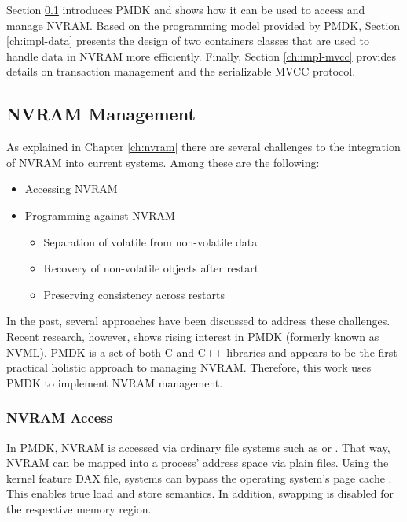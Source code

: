 Section \ref{ch:impl-nvram} introduces PMDK and shows how it can be used to
access and manage NVRAM. Based on the programming model provided by PMDK, Section
\ref{ch:impl-data} presents the design of two containers classes that are used
to handle data in NVRAM more efficiently. Finally, Section \ref{ch:impl-mvcc}
provides details on transaction management and the serializable MVCC protocol.

\subsection{NVRAM Management}
\label{ch:impl-nvram}

As explained in Chapter \ref{ch:nvram} there are several challenges to the
integration of NVRAM into current systems. Among these are the following:

\begin{itemize}
    \item Accessing NVRAM
    \item Programming against NVRAM
    \begin{itemize}
        \item Separation of volatile from non-volatile data
        \item Recovery of non-volatile objects after restart
        \item Preserving consistency across restarts
    \end{itemize}
\end{itemize}

In the past, several approaches have been discussed to address these challenges.
Recent research, however, shows rising interest in PMDK (formerly known as
NVML). PMDK is a set of both C and C++ libraries and appears to be the first
practical holistic approach to managing NVRAM. Therefore, this work uses PMDK to
implement NVRAM management.

\subsubsection{NVRAM Access}

In PMDK, NVRAM is accessed via ordinary file systems such as  or
. That way, NVRAM can be mapped into a process' address space via
plain files. Using the kernel feature \ac{DAX} file,
systems can bypass the operating system's page cache \cite{oukid2017data,
andrei2017sap, rudoff2017persistent}. This enables true load and store
semantics. In addition, swapping is disabled for the respective memory region.

